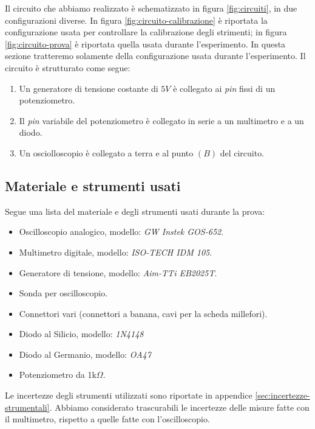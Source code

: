 \documentclass[11pt, a4paper, twoside]{article}
\begin{document}
    Il circuito che abbiamo realizzato è schematizzato in figura \ref{fig:circuiti}, in due configurazioni diverse. In figura \ref{fig:circuito-calibrazione}
    è riportata la configurazione usata per controllare la calibrazione degli strimenti; in figura \ref{fig:circuito-prova}
    è riportata quella usata durante l'esperimento. In questa sezione tratteremo solamente della configurazione usata
    durante l'esperimento. Il circuito è strutturato come segue:
    \begin{enumerate}
      \item%
        Un generatore di tensione costante di $5V$ è collegato ai \emph{pin} fissi di un potenziometro.
      \item%
        Il \emph{pin} variabile del potenziometro è collegato in serie a un multimetro e a un diodo.
      \item%
        Un osciolloscopio è collegato a terra e al punto $(B)$ del circuito.
    \end{enumerate}

  \subsection{Materiale e strumenti usati}\label{subsec:materiali}
    Segue una lista del materiale e degli strumenti usati durante la prova:
      \begin{itemize}
        \item%
          Oscilloscopio analogico, modello: \emph{GW Instek GOS-652}.
        \item%
          Multimetro digitale, modello: \emph{ISO-TECH IDM 105}.
        \item%
          Generatore di tensione, modello: \emph{Aim-TTi EB2025T}.
        \item%
          Sonda per oscilloscopio.
        \item%
          Connettori vari (connettori a banana, cavi per la scheda millefori).
        \item%
          Diodo al Silicio, modello: \emph{1N4148}
        \item%
          Diodo al Germanio, modello: \emph{OA47}
        \item
          Potenziometro da 1k$\Omega$.
      \end{itemize}
    Le incertezze degli strumenti utilizzati sono riportate in appendice \ref{sec:incertezze-strumentali}.
    Abbiamo considerato trascurabili le incertezze delle misure fatte con il multimetro, rispetto a quelle fatte con l'oscilloscopio.
\end{document}
